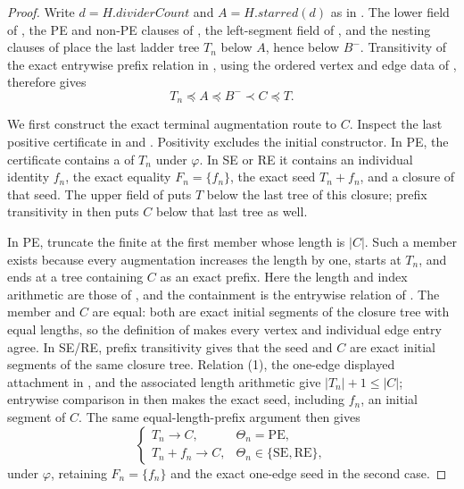 \begin{proof}
Write $d=H.\mathit{dividerCount}$ and
$A=H.\mathit{starred}(d)$ as in .  The
lower field of , the PE and non-PE clauses
of , the left-segment field of
, and the nesting clauses of
 place the last ladder tree $T_n$ below $A$,
hence below $B^-$.  Transitivity of the exact entrywise prefix relation in
, using the ordered vertex and edge data
of , therefore gives
\[
                    T_n\preccurlyeq A\preccurlyeq B^-
                       \prec C\preccurlyeq T.                 \tag{1}
\]

We first construct the exact terminal augmentation route to $C$.  Inspect
the last positive certificate in  and
.  Positivity excludes the initial
constructor.  In PE, the certificate contains a
 of $T_n$ under $\varphi$.  In SE or RE it
contains an individual identity $f_n$, the exact equality $F_n=\{f_n\}$,
the exact seed $T_n+f_n$, and a closure of that seed.  The upper field of
 puts $T$ below the last tree of this
closure; prefix transitivity in  then
puts $C$ below that last tree as well.

In PE, truncate the finite
 at the first member whose length
is $|C|$.  Such a member exists because every augmentation increases the
length by one, starts at $T_n$, and ends at a tree containing $C$ as an
exact prefix.  Here the length and index arithmetic are those of
, and the containment is the entrywise relation of
.  The member and $C$ are equal: both
are exact initial segments of the closure tree with equal lengths, so the
definition of  makes every vertex and
individual edge entry agree.  In SE/RE, prefix transitivity gives that the
seed and $C$ are exact initial segments of the same closure tree.  Relation
(1), the one-edge displayed attachment in , and the
associated length arithmetic give $|T_n|+1\leq |C|$; entrywise comparison
in  then makes the exact seed,
including $f_n$, an initial segment of $C$.  The same equal-length-prefix
argument then gives
\[
 \begin{cases}
 T_n\longrightarrow C,&\Theta_n=\mathrm{PE},\\
 T_n+f_n\longrightarrow C,&\Theta_n\in\{\mathrm{SE},\mathrm{RE}\},
 \end{cases}                                                  \tag{2}
\]
under $\varphi$, retaining $F_n=\{f_n\}$ and the exact one-edge seed in
the second case.


\end{proof}
